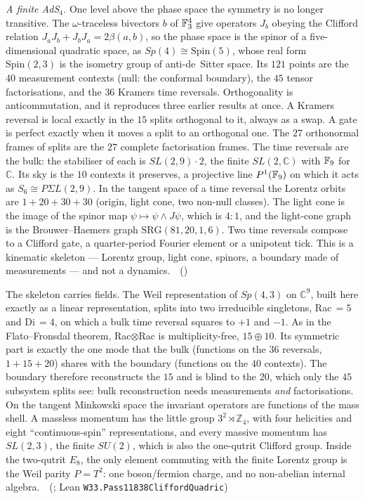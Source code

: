 \emph{A finite AdS$_4$.} One level above the phase space the symmetry is no longer transitive. The $\omega$-traceless
bivectors $b$ of $\mathbb{F}_3^4$ give operators $J_b$ obeying the Clifford relation $J_aJ_b+J_bJ_a=2\beta(a,b)$, so the
phase space is the spinor of a five-dimensional quadratic space, as $Sp(4)\cong\mathrm{Spin}(5)$, whose real form
$\mathrm{Spin}(2,3)$ is the isometry group of anti-de~Sitter space. Its $121$ points are the $40$ measurement contexts
(null: the conformal boundary), the $45$ tensor factorisations, and the $36$ Kramers time reversals. Orthogonality is
anticommutation, and it reproduces three earlier results at once. A Kramers reversal is local exactly in the $15$ splits
orthogonal to it, always as a swap. A gate is perfect exactly when it moves a split to an orthogonal one. The $27$
orthonormal frames of splits are the $27$ complete factorisation frames. The time reversals are the bulk: the stabiliser
of each is $SL(2,9)\cdot2$, the finite $SL(2,\mathbb C)$ with $\mathbb{F}_9$ for $\mathbb C$. Its sky is the $10$ contexts it
preserves, a projective line $P^1(\mathbb{F}_9)$ on which it acts as $S_6\cong P\Sigma L(2,9)$. In the tangent space of a time
reversal the Lorentz orbits are $1+20+30+30$ (origin, light cone, two non-null classes). The light cone is the image of the
spinor map $\psi\mapsto\psi\wedge J\psi$, which is $4:1$, and the light-cone graph is the Brouwer--Haemers graph
$\mathrm{SRG}(81,20,1,6)$. Two time reversals compose to a Clifford gate, a quarter-period Fourier element or a unipotent
tick. This is a kinematic skeleton --- Lorentz group, light cone, spinors, a boundary made of measurements --- and not a
dynamics. \tierT\,\tierC\ ()

The skeleton carries fields. The Weil representation of $Sp(4,3)$ on $\mathbb C^9$, built here exactly as a linear
representation, splits into two irreducible singletons, Rac$\,=5$ and Di$\,=4$, on which a bulk time reversal squares to
$+1$ and $-1$. As in the Flato--Fronsdal theorem, Rac$\otimes$Rac is multiplicity-free, $15\oplus10$. Its symmetric part
is exactly the one mode that the bulk (functions on the $36$ reversals, $1+15+20$) shares with the boundary (functions on
the $40$ contexts). The boundary therefore reconstructs the $15$ and is blind to the $20$, which only the $45$ subsystem
splits see: bulk reconstruction needs measurements \emph{and} factorisations. On the tangent Minkowski space the invariant
operators are functions of the mass shell. A massless momentum has the little group $3^2\rtimes\mathbb Z_4$, with four
helicities and eight ``continuous-spin'' representations, and every massive momentum has $SL(2,3)$, the finite $SU(2)$,
which is also the one-qutrit Clifford group. Inside the two-qutrit $E_8$, the only element commuting with the finite
Lorentz group is the Weil parity $P=T^2$: one boson/fermion charge, and no non-abelian internal algebra.
\tierT\,\tierC\ (; Lean \texttt{W33.Pass11838CliffordQuadric})

